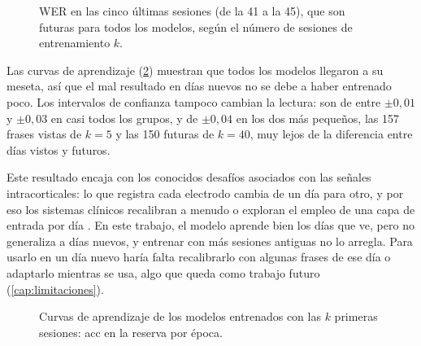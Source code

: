 \begin{figure}[htbp]
  \centering
  \caption[WER en las últimas cinco sesiones]{WER en las cinco últimas sesiones (de la 41 a la 45), que son futuras para todos los modelos, según el número de sesiones de entrenamiento $k$.}
  \label{fig:res-ultimas}
\end{figure}

Las curvas de aprendizaje (\cref{fig:res-curvas-cronologico}) muestran que todos los modelos llegaron a su meseta, así que el mal resultado en días nuevos no se debe a haber entrenado poco. Los intervalos de confianza tampoco cambian la lectura: son de entre $\pm 0{,}01$ y $\pm 0{,}03$ en casi todos los grupos, y de $\pm 0{,}04$ en los dos más pequeños, las 157 frases vistas de $k = 5$ y las 150 futuras de $k = 40$, muy lejos de la diferencia entre días vistos y futuros.

Este resultado encaja con los conocidos desafíos asociados con las señales intracorticales: lo que registra cada electrodo cambia de un día para otro, y por eso los sistemas clínicos recalibran a menudo o exploran el empleo de una capa de entrada por día \cite{sussillo2016,fan2023corp}. En este trabajo, el modelo aprende bien los días que ve, pero no generaliza a días nuevos, y entrenar con más sesiones antiguas no lo arregla. Para usarlo en un día nuevo haría falta recalibrarlo con algunas frases de ese día o adaptarlo mientras se usa, algo que queda como trabajo futuro (\cref{cap:limitaciones}).

\begin{figure}[htbp]
  \centering
  \caption[Curvas de aprendizaje de los modelos entrenados con las $k$ primeras sesione]{Curvas de aprendizaje de los modelos entrenados con las $k$ primeras sesiones: acc en la reserva por época.}
  \label{fig:res-curvas-cronologico}
\end{figure}


